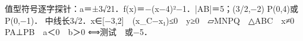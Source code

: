 \documentclass[fontset=none]{ctexart}
\begin{document}
值型符号逐字探针：a＝±3√21．f(x)＝−(x−4)²−1．|AB|＝5；(3/2,−2) P(0,4)或P(0,−1)．
中线长3√2．x∈[−3,2]　(x_C−x₁)≤0　y≥0　▱MNPQ　△ABC　x≠0　PA⊥PB　a＜0　b＞0
⟺测试　或−5．
\end{document}
